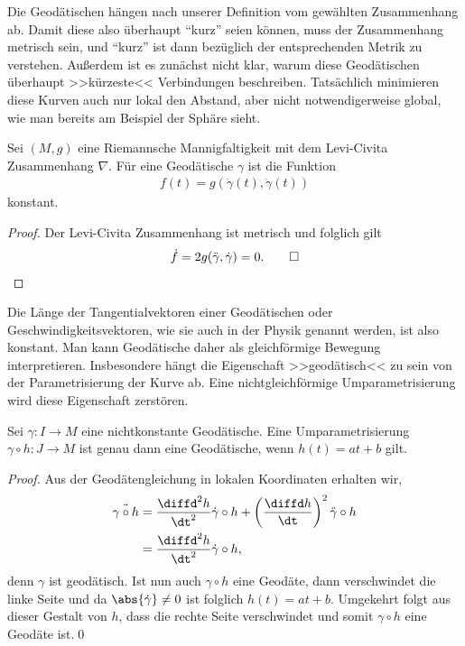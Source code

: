 \documentclass[%
	paper=a5,%
	fleqn,%
	DIV=18,%
	BCOR=0mm,
	fontsize=11pt,
	titlepage=false,%
	bibliography=totoc,
	DIV=18,%
	twoside=true,
	pdftitle=Riemannsche Geometrie,
	pdfauthor=Uwe Semmelmann,
	numbers=noendperiod]%
	{scrbook}
\begin{document}
Die Geodätischen hängen nach unserer Definition vom gewählten Zusammenhang ab. Damit diese also überhaupt ``kurz'' seien können, muss der Zusammenhang metrisch sein, und ``kurz'' ist dann bezüglich der entsprechenden Metrik zu verstehen.
Außerdem ist es zunächst nicht klar, warum diese Geodätischen überhaupt >>kürzeste<< Verbindungen
beschreiben. Tatsächlich minimieren diese Kurven auch nur lokal den Abstand,
aber nicht notwendigerweise global, wie man bereits am Beispiel der Sphäre
sieht.

\begin{lem}
Sei $(M,g)$ eine Riemannsche Mannigfaltigkeit mit dem Levi-Civita
Zusammenhang $\nabla$. Für eine Geodätische $\gamma$ ist die Funktion
\begin{align*}
f(t) = g(\dot{\gamma}(t),\dot{\gamma}(t))
\end{align*}
konstant.\fish
\end{lem}
\begin{proof}
Der Levi-Civita Zusammenhang ist metrisch und folglich gilt
\begin{align*}
\dot{f} = 2g(\ddot{\gamma},\dot\gamma) = 0.\qed
\end{align*}
\end{proof}

Die Länge der Tangentialvektoren einer Geodätischen oder Geschwindigkeitsvektoren, wie sie auch in
der Physik genannt werden,  ist also konstant. Man kann Geodätische
daher als gleichförmige Bewegung interpretieren. Insbesondere hängt die
Eigenschaft >>geodätisch<< zu sein von der Parametrisierung der Kurve ab. Eine
nichtgleichförmige Umparametrisierung wird diese Eigenschaft zerstören.

\begin{lem}
Sei $\gamma: I\to M$ eine nichtkonstante Geodätische. Eine Umparametrisierung $\gamma\circ h : J\to M$ ist genau dann eine Geodätische, wenn $h(t) = at + b$ gilt.\fish
\end{lem}
\begin{proof}
Aus der Geodätengleichung in lokalen Koordinaten erhalten wir,
\begin{align*}
\ddot{\gamma\circ h} &= \frac{\diffd^2 h}{\dt^2} \dot{\gamma}\circ h + 
\left( \frac{\diffd h}{\dt}\right)^2 \ddot{\gamma}\circ h\\
&=\frac{\diffd^2 h}{\dt^2} \dot{\gamma}\circ h,
\end{align*}
denn $\gamma$ ist geodätisch. Ist nun auch $\gamma\circ h$ eine Geodäte, dann verschwindet die linke Seite und da $\abs{\dot\gamma}\neq 0$ ist folglich $h(t) = at+b$. Umgekehrt folgt aus dieser Gestalt von $h$, dass die rechte Seite verschwindet und somit $\gamma\circ h$ eine Geodäte ist.\qed
\end{proof}
\end{document}
